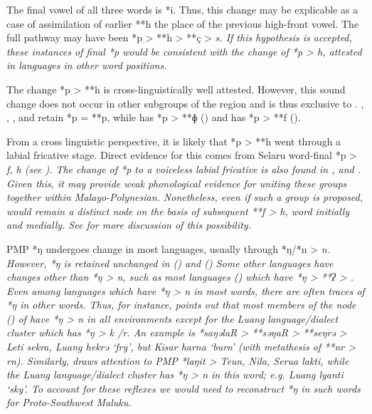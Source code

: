 The final vowel of all three words is *i.
Thus, this change may be explicable as a case of assimilation
of earlier **h the place of the previous high-front vowel.
The full pathway may have been *p > **h > **ç > \it{s}.
If this hypothesis is accepted,
these instances of final *p would be consistent with the change
of *p > \it{h,} {\0} attested in  languages
in other word positions.

The change *p > **h is cross-linguistically well attested.
However, this sound change does not occur in other subgroups
of the region and is thus exclusive to .
, , ,
and  retain *p = **p,
while  has *p > **ɸ ()
and  has *p > **f ().

From a cross linguistic perspective,
it is likely that  *p > **h went through a labial fricative stage.
Direct evidence for this comes from Selaru word-final *p > \it{f, h} (see ).
The change of *p to a voiceless labial fricative is also found
in , and .
Given this, it may provide weak phonological evidence for uniting
these groups together within Malayo-Polynesian.
Nonetheless, even if such a group is proposed,
 would remain a distinct node on the basis of
subsequent **f > \it{h,} {\0} word initially and medially.
See  for more discussion of this possibility.

PMP *ŋ undergoes change in most  languages,
usually through *ŋ/*n > \it{n}.
However, *ŋ is retained unchanged in  ()
and  () Some other languages
have changes other than *ŋ > \it{n},
such as most  languages ()
which have *ŋ > **ʔ > {\0}.
Even among languages which have *ŋ > \it{n} in most words,
there are often traces of *ŋ in other words.
Thus, for instance, \citet{Mills2010} points out that most members
of the  node () of  have *ŋ > \it{n} in all environments except for the Luang
language/dialect cluster which has *ŋ > \it{k} /{\gap}\it{r}.
An example is *saŋəlaR > **səŋaR > **seŋrə > Leti \it{sekra},
Luang \it{hekrə} ‘fry’, but Kisar \it{harna} ‘burn’ (with metathesis
of **nr > \it{rn}).
Similarly, \citet{Mills2010} draws attention to PMP *laŋit >
Teun, Nila, Serua \it{lakti}, while the Luang language/dialect cluster
has *ŋ > \it{n} in this word; e.g. Luang \it{lyanti} ‘sky’.
To account for these reflexes we would need to reconstruct *ŋ
in such words for Proto-Southwest Maluku.

